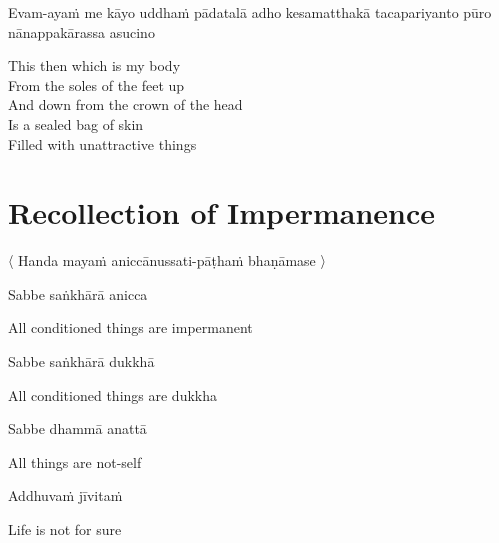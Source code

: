 \begin{pali-hang}
Evam-ayaṁ me kāyo uddhaṁ pādatalā adho kesamatthakā tacapariyanto pūro nānappakārassa asucino
\end{pali-hang}

\begin{english-verses}
  This then which is my body\\
  From the soles of the feet up\\
  And down from the crown of the head\\
  Is a sealed bag of skin\\
  Filled with unattractive things
\end{english-verses}



\suttaRef{[DN 22]}


\section{Recollection of Impermanence}
\label{recollection-impermanence}

\begin{leader}
  〈 Handa mayaṁ aniccānussati-pāṭhaṁ bhaṇāmase 〉
\end{leader}

Sabbe saṅkhārā anicca

\begin{english}
  All conditioned things are impermanent
\end{english}

Sabbe saṅkhārā dukkhā

\begin{english}
  All conditioned things are dukkha
\end{english}

Sabbe dhammā anattā

\begin{english}
  All things are not-self\hyperlink{endnote103-appendix}{\hypertarget{endnote103-body}{}}
\end{english}

\suttaRef{[Dhp 277-279]}

Addhuvaṁ jīvitaṁ

\begin{english}
  Life is not for sure
\end{english}

